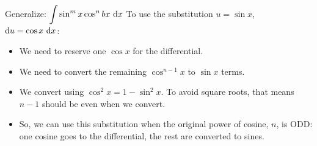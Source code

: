 \begin{frame}{Generalize: $\displaystyle\int \sin^m x\cos^nbx~\textup{\text{d}} x$}
To use the substitution \textcolor{M3}{$u=\sin x$},~\textcolor{C3}{ $\text{d} u=\cos x ~\text{d} x$}:
\pause
\begin{itemize}[<+->]
\item We need to \textcolor{C3}{reserve} one \textcolor{C3}{$\cos x$} for the differential.
\item We need to \textcolor{M3}{convert} the remaining \textcolor{M3}{$\cos^{n-1} x$} to \textcolor{M3}{$\sin x$} terms.
\item We convert using \textcolor{M4}{$\cos^2 x = 1-\sin^2 x$}. To avoid square roots, that means $n-1$ should be \textcolor{M4}{even when we convert}.
\item \textcolor{W1}{So, we can use this substitution when the original power of cosine, $n$, is ODD: one cosine goes to the differential, the rest are converted to sines.}
\end{itemize}
\end{frame}

